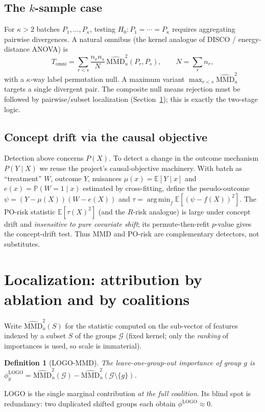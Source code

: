 \documentclass[11pt]{article}
\newtheorem{definition}{Definition}
\DeclareMathOperator*{\argmin}{arg\,min}
\newcommand{\E}{\mathbb{E}}
\newcommand{\PR}{\mathbb{P}}
\newcommand{\Gcal}{\mathcal{G}}
\newcommand{\MMD}{\mathrm{MMD}}
\begin{document}
\subsection{The $k$-sample case}

For $\kappa>2$ batches $P_1,\dots,P_\kappa$, testing $H_0:P_1=\cdots=P_\kappa$
requires aggregating pairwise divergences. A natural omnibus (the kernel analogue
of DISCO / energy-distance ANOVA) is
\begin{equation}
T_{\text{omni}}=\sum_{r<s}\frac{n_r n_s}{N}\,\widehat{\MMD}^2_u(P_r,P_s),
\qquad N=\textstyle\sum_r n_r,
\end{equation}
with a $\kappa$-way label permutation null. A maximum variant
$\max_{r<s}\widehat{\MMD}^2_u$ targets a single divergent pair. The composite
null means rejection must be followed by pairwise/subset localization
(Section~\ref{sec:localization}); this is exactly the two-stage logic.

\subsection{Concept drift via the causal objective}

Detection above concerns $P(X)$. To detect a change in the outcome mechanism
$P(Y\mid X)$ we reuse the project's causal-objective machinery. With batch as
``treatment'' $W$, outcome $Y$, nuisances $\mu(x)=\E[Y\mid x]$ and
$e(x)=\PR(W=1\mid x)$ estimated by cross-fitting, define the pseudo-outcome
$\psi=(Y-\mu(X))(W-e(X))$ and $\tau=\argmin_f \E[(\psi-f(X))^2]$. The PO-risk
statistic $\E[\tau(X)^2]$ (and the $R$-risk analogue) is large under concept
drift and \emph{insensitive to pure covariate shift}; its permute-then-refit
$p$-value gives the concept-drift test. Thus MMD and PO-risk are complementary
detectors, not substitutes.

\section{Localization: attribution by ablation and by coalitions}
\label{sec:localization}

Write $\widehat{\MMD}^2_u(S)$ for the statistic computed on the sub-vector of
features indexed by a subset $S$ of the groups $\Gcal$ (fixed kernel; only the
\emph{ranking} of importances is used, so scale is immaterial).

\begin{definition}[LOGO-MMD]
The leave-one-group-out importance of group $g$ is
$\phi^{\mathrm{LOGO}}_g=\widehat{\MMD}^2_u(\Gcal)-\widehat{\MMD}^2_u(\Gcal\setminus\{g\})$.
\end{definition}
LOGO is the single marginal contribution \emph{at the full coalition}. Its blind
spot is redundancy: two duplicated shifted groups each obtain
$\phi^{\mathrm{LOGO}}\approx 0$.
\end{document}

